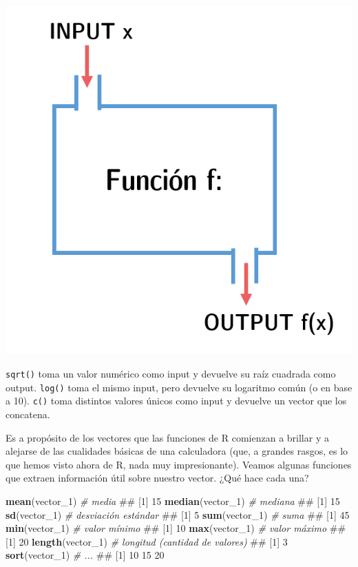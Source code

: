 \documentclass[]{book}
\newenvironment{Shaded}{\begin{snugshade}}{\end{snugshade}}
\newcommand{\KeywordTok}[1]{\textcolor[rgb]{0.13,0.29,0.53}{\textbf{#1}}}
\newcommand{\DecValTok}[1]{\textcolor[rgb]{0.00,0.00,0.81}{#1}}
\newcommand{\CommentTok}[1]{\textcolor[rgb]{0.56,0.35,0.01}{\textit{#1}}}
\newcommand{\NormalTok}[1]{#1}
\begin{document}
\begin{center}\includegraphics[width=8.54in]{00-images/rbas-funs} \end{center}

\texttt{sqrt()} toma un valor numérico como input y devuelve su raíz
cuadrada como output. \texttt{log()} toma el mismo input, pero devuelve
su logaritmo común (o en base a 10). \texttt{c()} toma distintos valores
únicos como input y devuelve un vector que los concatena.

Es a propósito de los vectores que las funciones de R comienzan a
brillar y a alejarse de las cualidades básicas de una calculadora (que,
a grandes rasgos, es lo que hemos visto ahora de R, nada muy
impresionante). Veamos algunas funciones que extraen información útil
sobre nuestro vector. ¿Qué hace cada una?

\begin{Shaded}
\begin{Highlighting}[]
\KeywordTok{mean}\NormalTok{(vector_}\DecValTok{1}\NormalTok{) }\CommentTok{# media}
\NormalTok{## [1] 15}
\KeywordTok{median}\NormalTok{(vector_}\DecValTok{1}\NormalTok{) }\CommentTok{# mediana}
\NormalTok{## [1] 15}
\KeywordTok{sd}\NormalTok{(vector_}\DecValTok{1}\NormalTok{) }\CommentTok{# desviación estándar}
\NormalTok{## [1] 5}
\KeywordTok{sum}\NormalTok{(vector_}\DecValTok{1}\NormalTok{) }\CommentTok{# suma}
\NormalTok{## [1] 45}
\KeywordTok{min}\NormalTok{(vector_}\DecValTok{1}\NormalTok{) }\CommentTok{# valor mínimo}
\NormalTok{## [1] 10}
\KeywordTok{max}\NormalTok{(vector_}\DecValTok{1}\NormalTok{) }\CommentTok{# valor máximo}
\NormalTok{## [1] 20}
\KeywordTok{length}\NormalTok{(vector_}\DecValTok{1}\NormalTok{) }\CommentTok{# longitud (cantidad de valores)}
\NormalTok{## [1] 3}
\KeywordTok{sort}\NormalTok{(vector_}\DecValTok{1}\NormalTok{) }\CommentTok{# ...}
\NormalTok{## [1] 10 15 20}
\end{Highlighting}
\end{Shaded}
\end{document}

